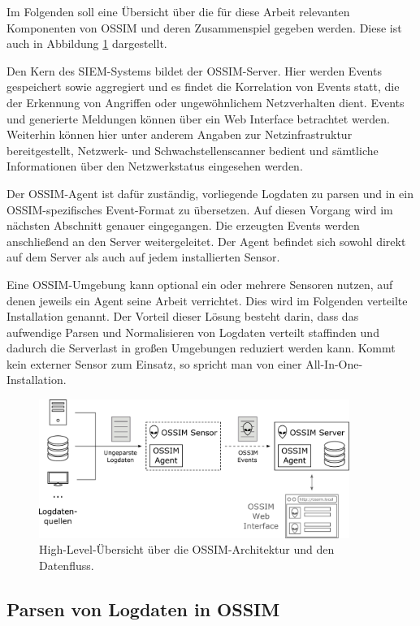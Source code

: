 Im Folgenden soll eine Übersicht über die für diese Arbeit relevanten Komponenten von OSSIM und deren Zusammenspiel gegeben werden. Diese ist auch in Abbildung \ref{fig:ossim_log_flow} dargestellt.

Den Kern des SIEM-Systems bildet der OSSIM-Server. Hier werden Events gespeichert sowie aggregiert und es findet die Korrelation von Events statt, die der Erkennung von Angriffen oder ungewöhnlichem Netzverhalten dient. Events und generierte Meldungen können über ein Web Interface betrachtet werden. Weiterhin können hier unter anderem Angaben zur Netzinfrastruktur bereitgestellt, Netzwerk- und Schwachstellenscanner bedient und sämtliche Informationen über den Netzwerkstatus eingesehen werden. 

Der OSSIM-Agent ist dafür zuständig, vorliegende Logdaten zu parsen und in ein OSSIM-spezifisches Event-Format zu übersetzen. Auf diesen Vorgang wird im nächsten Abschnitt genauer eingegangen. Die erzeugten Events werden anschließend an den Server weitergeleitet. Der Agent befindet sich sowohl direkt auf dem Server als auch auf jedem installierten Sensor. 

Eine OSSIM-Umgebung kann optional ein oder mehrere Sensoren nutzen, auf denen jeweils ein Agent seine Arbeit verrichtet. Dies wird im Folgenden verteilte Installation genannt. Der Vorteil dieser Lösung besteht darin, dass das aufwendige Parsen und Normalisieren von Logdaten verteilt staffinden und dadurch die Serverlast in großen Umgebungen reduziert werden kann. Kommt kein externer Sensor zum Einsatz, so spricht man von einer All-In-One-Installation.

\begin{figure}[]
    \centering
        \includegraphics[width=0.9\textwidth]{dia/ossim_log_flow.pdf}
    \caption{High-Level-Übersicht über die OSSIM-Architektur und den Datenfluss.}
    \label{fig:ossim_log_flow}
\end{figure}


\subsection{Parsen von Logdaten in OSSIM}

